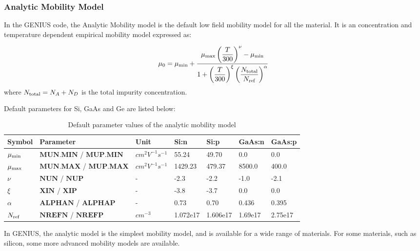 \documentclass[oneside,12pt]{cgd_book}
\begin{document}
\subsubsection{Analytic Mobility Model}
\label{sec:Equation:Mobility:Bulk:Analytic}
In the GENIUS code, the Analytic Mobility model
\cite[Selberherr1984P]{} is the
          default low field mobility model for all the material. It is an concentration and temperature dependent
          empirical mobility model expressed as:
\par
\begin{equation}
\mu_{0}=\mu_{\rm min}+\dfrac{\mu_{\rm max}\left(\dfrac{T}{300}\right)^\nu-\mu_{\rm
            min}}{1+\left(\dfrac{T}{300}\right)^\xi \left(\dfrac{N_{\rm total}}{N_{\rm ref}}\right)^\alpha}
\end{equation}
where $N_{\rm total}=N_A+N_D$ is the total impurity concentration.
\par
Default parameters for Si, GaAs and Ge are listed below:
\par
\begin{longtable}{lllllll}
\caption{\label{tab:Equation:Mobility:Analytic:Param}Default parameter values of the analytic mobility model} \\
\hline
 Symbol
& Parameter
& Unit
& Si:n
& Si:p
& GaAs:n
& GaAs:p\\
\hline
 $\mu_{\rm min}$
& $\mathbf{MUN.MIN}$ / $\mathbf{MUP.MIN}$
& $cm^2V^{-1}s^{-1}$
& 55.24
& 49.70
& 0.0
& 0.0
\\
 $\mu_{\rm max}$
& $\mathbf{MUN.MAX}$ / $\mathbf{MUP.MAX}$
& $cm^2V^{-1}s^{-1}$
& 1429.23
& 479.37
& 8500.0
& 400.0
\\
 $\nu$
& $\mathbf{NUN}$ / $\mathbf{NUP}$
& -
& -2.3
& -2.2
& -1.0
& -2.1
\\
 $\xi$
& $\mathbf{XIN}$ / $\mathbf{XIP}$
& -
& -3.8
& -3.7
& 0.0
& 0.0
\\
 $\alpha$
& $\mathbf{ALPHAN}$ / $\mathbf{ALPHAP}$
& -
& 0.73
& 0.70
& 0.436
& 0.395
\\
 $N_{\rm ref}$
& $\mathbf{NREFN}$ / $\mathbf{NREFP}$
& $cm^{-3}$
& 1.072e17
& 1.606e17
& 1.69e17
& 2.75e17\\
\end{longtable}
In GENIUS, the analytic model is the simplest mobility model, and is available for a wide range of
          materials. For some materials, such as silicon, some more advanced mobility models are available.
\par
\par
\end{document}
